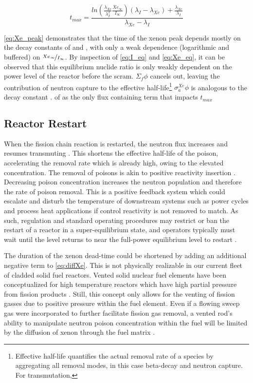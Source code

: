 \begin{equation}\label{eq:Xe_peak}
    t_{max} = \frac{ln\left(\frac{\lambda_{Xe}}{\lambda_{I}^2}\frac{Xe_{\infty}}{I_{\infty}}\right)\left(\lambda_{I}-\lambda_{Xe}\right)+\frac{\lambda_{Xe}}{\lambda_{I}}}{\lambda_{Xe}-\lambda_{I}}
\end{equation}

\ref{eq:Xe_peak} demonstrates that the time of the xenon peak depends mostly on the decay constants of \Xe and \I, with only a weak dependence (logarithmic and buffered) on $\nicefrac{Xe_{\infty}}{I_\infty}$. By inspection of \ref{eq:I_eq} and \ref{eq:Xe_eq}, it can be observed that this equilibrium nuclide ratio is only weakly dependent on the power level of the reactor before the scram. $\Sigma_f\phi$ cancels out, leaving the contribution of neutron capture to the effective half-life\footnote{\label{fn:EHL} Effective half-life quantifies the actual removal rate of a species by aggregating all removal modes, in this case beta-decay and neutron capture. For transmutation,} $\sigma_a^{Xe}\phi$ is analogous to the decay constant \cite[Ch. 7]{Lamarsh}.
of \Xe as the only flux containing term that impacts $t_{max}$ 


\subsection{Reactor Restart}
When the fission chain reaction is restarted, the neutron flux increases and resumes transmuting \Xe. This shortens the effective half-life of the poison, accelerating the removal rate which is already high, owing to the elevated concentration. The removal of poisons is akin to positive reactivity insertion \cite{Roberson}. Decreasing poison concentration increases the neutron population and therefore the rate of poison removal. This is a positive feedback system which could escalate and disturb the temperature of downstream systems such as power cycles and process heat applications if control reactivity is not removed to match. As such, regulation and standard operating procedures may restrict or ban the restart of a reactor in a super-equilibrium state, and operators typically must wait until the \Xe level returns to near the full-power equilibrium level to restart \cite{CFR}.

The duration of the xenon dead-time could be shortened by adding an additional negative term to \ref{eq:diffXe}. This is not physically realizable in our current fleet of cladded solid fuel reactors. Vented solid nuclear fuel elements have been conceptualized for high temperature reactors which have high partial pressure from fission products \cite{VentPatent,VentedRods}. Still, this concept only allows for the venting of fission gasses due to positive pressure within the fuel element. Even if a flowing sweep gas were incorporated to further facilitate fission gas removal, a vented rod's ability to manipulate neutron poison concentration within the fuel will be limited by the diffusion of xenon through the fuel matrix \cite{XeDiffuse}.

